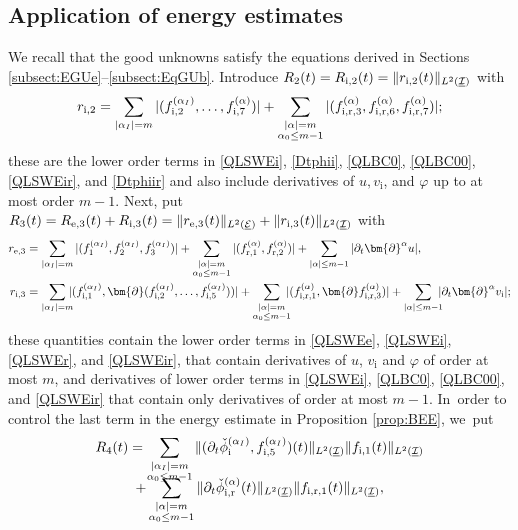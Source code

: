 \documentclass[JEP,XML,SOM,Unicode,NoFloatCountersInSection,published]{cedram}
\newcommand{\dt}{\partial_t}
\newcommand{\cI}{{\mathcal I}}
\newcommand{\cE}{{\mathcal E}}
\newcommand{\ul}[1]{\underline{#1}}
\theoremstyle{definition}
\begin{document}
\subsection{Application of energy estimates}\label{sectAppl}
We recall that the good unknowns satisfy the equations derived in Sections \ref{subsect:EGUe}--\ref{subsect:EqGUb}.
Introduce $R_2(t)=R_{{\rm i},2}(t)=\|r_{{\rm i},2}(t)\|_{L^2(\ul{\cI})}$ with
\[
r_{{\rm i},2} = \sum_{|\alpha_I|=m} |(f_{{\rm i},2}^{(\alpha_I)},\ldots,f_{{\rm i},7}^{(\alpha)})|
+ \sum_{\substack{|\alpha|=m\\\alpha_0\leq m-1}} |(f_{{\rm i,r},3}^{(\alpha)},f_{{\rm i,r},6}^{(\alpha)},f_{{\rm i,r},7}^{(\alpha)})|;
\]
these are the lower order terms in \eqref{QLSWEi}, \eqref{Dtphii}, \eqref{QLBC0}, \eqref{QLBC00}, \eqref{QLSWEir}, and \eqref{Dtphiir}
and also include derivatives of $u,v_\mathrm{i}$, and $\varphi$ up to at most order $m-1$.
Next, put $R_3(t)=R_{{\rm e},3}(t)+R_{{\rm i},3}(t)=\|r_{{\rm e},3}(t)\|_{L^2(\ul{\cE})}+\|r_{{\rm i},3}(t)\|_{L^2(\ul{\cI})}$ with
\begin{align*}
r_{{\rm e},3}
&= \sum_{|\alpha_I|=m} |(f_1^{(\alpha_I)},f_2^{(\alpha_I)},f_3^{(\alpha_I)})|
+ \sum_{\substack{|\alpha|=m\\\alpha_0\leq m-1}} |(f_{{\rm r},1}^{(\alpha)},f_{{\rm r},2}^{(\alpha)})| + \sum_{|\alpha|\leq m-1}|\dt\bm{\partial}^\alpha u|, \\
r_{{\rm i},3}
&= \sum_{|\alpha_I|=m}\hspace*{-2mm} |(f_{{\rm i},1}^{(\alpha_I)},\bm{\partial}(f_{{\rm i},2}^{(\alpha_I)},\ldots,f_{{\rm i},5}^{(\alpha_I)}))|
+ \sum_{\substack{|\alpha|=m\\\alpha_0\leq m-1}}\hspace*{-2mm} |(f_{{\rm i,r},1}^{(\alpha)},\bm{\partial}f_{{\rm i,r},3}^{(\alpha)})|
+ \sum_{|\alpha|\leq m-1}\hspace*{-2mm}|\dt\bm{\partial}^\alpha v_\mathrm{i}|;
\end{align*}
these quantities contain the lower order terms in \eqref{QLSWEe}, \eqref{QLSWEi}, \eqref{QLSWEr}, and \eqref{QLSWEir},
that contain derivatives of $u$, $v_\mathrm{i}$ and $\varphi$ of order at most $m$, and derivatives of lower order terms in
\eqref{QLSWEi}, \eqref{QLBC0}, \eqref{QLBC00}, and \eqref{QLSWEir} that contain only derivatives of order at most $m-1$. In~order to control the last term in the energy estimate in Proposition \ref{prop:BEE}, we~put
\begin{multline*}
R_4(t)
= \sum_{\substack{|\alpha_I|=m\\ \alpha_0\leq m-1}} \|(\dt\check{\phi}_\mathrm{i}^{(\alpha_I)},f_{{\rm i},5}^{(\alpha_I)})(t)\|_{L^2(\ul{\cI})}
\|f_{{\rm i},1}(t)\|_{L^2(\ul{\cI})} \\[-8pt]
+ \sum_{\substack{|\alpha|=m\\ \alpha_0\leq m-1}} \|\dt\check{\phi}_\mathrm{i,r}^{(\alpha)}(t)\|_{L^2(\ul{\cI})} \|f_{{\rm i,r},1}(t)\|_{L^2(\ul{\cI})},
\end{multline*}
\end{document}
